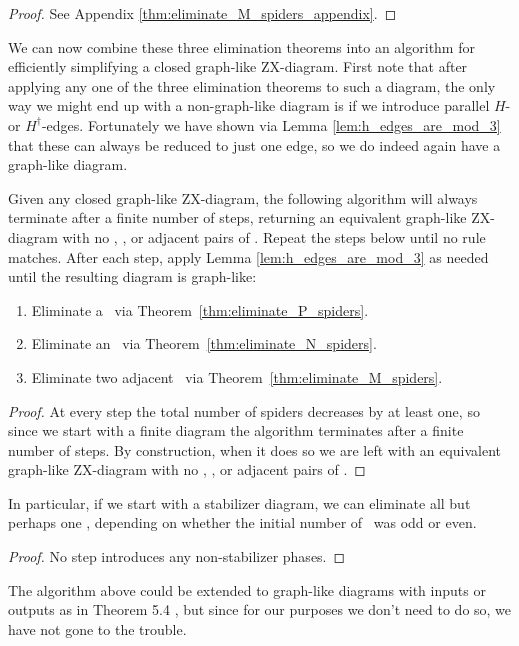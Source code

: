 \begin{theorem}\label{thm:eliminate_M_spiders}
	\eliminateMSpidersStatement
	\begin{proof}
		See Appendix \ref{thm:eliminate_M_spiders_appendix}.
	\end{proof}
\end{theorem}

We can now combine these three elimination theorems into an algorithm for efficiently simplifying a closed graph-like ZX-diagram. First note that after applying any one of the three elimination theorems to such a diagram, the only way we might end up with a non-graph-like diagram is if we introduce parallel $H$- or $H^\dagger$-edges. Fortunately we have shown via Lemma \ref{lem:h_edges_are_mod_3} that these can always be reduced to just one edge, so we do indeed again have a graph-like diagram.

\begin{theorem}\label{thm:simplification_algorithm_works}
	Given any closed graph-like ZX-diagram, the following algorithm will always terminate after a finite number of steps, returning an equivalent graph-like ZX-diagram with no \Nspiders, \Pspiders, or adjacent pairs of \Mspiders. Repeat the steps below until no rule matches. After each step, apply Lemma \ref{lem:h_edges_are_mod_3} as needed until the resulting diagram is graph-like:
	\begin{enumerate}
		\item Eliminate a \Pspider\ via Theorem~\ref{thm:eliminate_P_spiders}.
		\item Eliminate an \Nspider\ via Theorem~\ref{thm:eliminate_N_spiders}.
		\item Eliminate two adjacent \Mspiders\ via Theorem~\ref{thm:eliminate_M_spiders}.
	\end{enumerate}
	\begin{proof}
		At every step the total number of spiders decreases by at least one, so since we start with a finite diagram the algorithm terminates after a finite number of steps. By construction, when it does so we are left with an equivalent graph-like ZX-diagram with no \Nspiders, \Pspiders, or adjacent pairs of \Mspiders.
	\end{proof}
\end{theorem}

\begin{corollary}\label{cor:stabilizer_simplification_algorithm_works}
	In particular, if we start with a stabilizer diagram, we can eliminate all but perhaps one \Mspider, depending on whether the initial number of \Mspiders\ was odd or even. 
	\begin{proof}
		No step introduces any non-stabilizer phases.
	\end{proof}
\end{corollary}

The algorithm above could be extended to graph-like diagrams with inputs or outputs as in Theorem 5.4 \cite{graph_theoretic_simplification}, but since for our purposes we don't need to do so, we have not gone to the trouble.